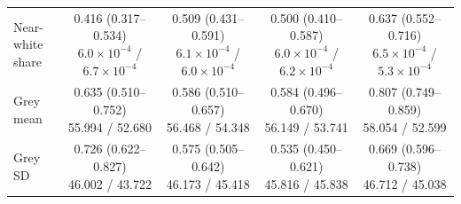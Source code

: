 \begin{tabular}{@{}lcccc@{}}
Near-white share & \makecell{0.416 (0.317--0.534)\\{\scriptsize $6.0\times10^{-4}$ / $6.7\times10^{-4}$}} & \makecell{0.509 (0.431--0.591)\\{\scriptsize $6.1\times10^{-4}$ / $6.0\times10^{-4}$}} & \makecell{0.500 (0.410--0.587)\\{\scriptsize $6.0\times10^{-4}$ / $6.2\times10^{-4}$}} & \makecell{0.637 (0.552--0.716)\\{\scriptsize $6.5\times10^{-4}$ / $5.3\times10^{-4}$}} \\
Grey mean & \makecell{0.635 (0.510--0.752)\\{\scriptsize 55.994 / 52.680}} & \makecell{0.586 (0.510--0.657)\\{\scriptsize 56.468 / 54.348}} & \makecell{0.584 (0.496--0.670)\\{\scriptsize 56.149 / 53.741}} & \makecell{0.807 (0.749--0.859)\\{\scriptsize 58.054 / 52.599}} \\
Grey SD & \makecell{0.726 (0.622--0.827)\\{\scriptsize 46.002 / 43.722}} & \makecell{0.575 (0.505--0.642)\\{\scriptsize 46.173 / 45.418}} & \makecell{0.535 (0.450--0.621)\\{\scriptsize 45.816 / 45.838}} & \makecell{0.669 (0.596--0.738)\\{\scriptsize 46.712 / 45.038}} \\
\bottomrule
\end{tabular}

